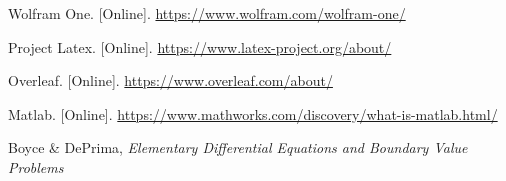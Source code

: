 





\begin{thebibliography}{99}







Wolfram One. [Online].
\url{https://www.wolfram.com/wolfram-one/}  

Project Latex. [Online].
\url{https://www.latex-project.org/about/}  

Overleaf. [Online].
\url{https://www.overleaf.com/about/}  

Matlab. [Online].
\url{https://www.mathworks.com/discovery/what-is-matlab.html/}  



Boyce \& DePrima,
{\it Elementary Differential Equations and Boundary Value Problems}



\end{thebibliography}
